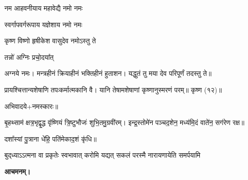 {नम आहवनीयाय महावेद्यै नमो नमः}

{स्वर्गापवर्गरूपाय यज्ञेशाय नमो नमः}

{कृष्ण विष्णो हृषीकेश वासुदेव नमोऽस्तु ते}

{तन्नो॑ अग्निः प्रचो॒दया᳚त्}

अग्नये नमः। मन्त्रहीनं क्रियाहीनं भक्तिहीनं हुताशन।
यद्धुतं तु मया देव परिपूर्णं तदस्तु ते॥

प्रायश्चित्तान्यशेषाणि तपःकर्मात्मकानि वै।
यानि तेषामशेषाणां कृष्णानुस्मरणं परम्॥ कृष्ण (१२)॥

अभिवादये+नमस्कारः॥

बृ॒हथ्साम॑ क्षत्र॒भृद्वृ॒द्ध वृ॑ष्णियं त्रि॒ष्टुभौजः॑ शुभि॒तमु॒ग्रवी॑रम्।
इन्द्र॒स्तोमे॑न पञ्चद॒शेन॒ मध्य॑मि॒दं वाते॑न॒ सग॑रेण रक्ष॥

दशा᳚स्यां पु॒त्राना धे॑हि॒ पति॑मेकाद॒शं कृ॑धि॥

{बुद्‌ध्याऽऽत्मना वा प्रकृतेः स्वभावात्}
{करोमि यद्यत् सकलं परस्मै}
{नारायणायेति समर्पयामि}

\textbf{आचमनम्।}
